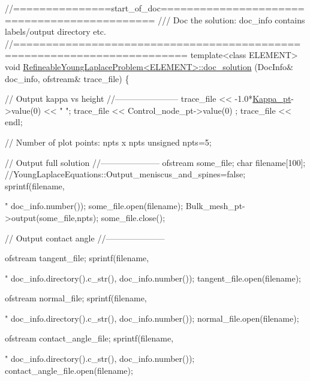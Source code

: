 \begin{DoxyCodeInclude}
\textcolor{comment}{//===============start\_of\_doc=============================================}
\textcolor{comment}{/// Doc the solution: doc\_info contains labels/output directory etc.}
\textcolor{comment}{}\textcolor{comment}{//========================================================================}
\textcolor{keyword}{template}<\textcolor{keyword}{class} ELEMENT>
\textcolor{keywordtype}{void} \hyperlink{classRefineableYoungLaplaceProblem_a4ec7313c8e4015b0c2af0bbef789e70f}{RefineableYoungLaplaceProblem<ELEMENT>::doc\_solution}
      (DocInfo& doc\_info,
                                              ofstream& trace\_file)
\{ 

 \textcolor{comment}{// Output kappa vs height}
 \textcolor{comment}{//-----------------------}
 trace\_file << -1.0*\hyperlink{namespaceGlobalParameters_ac6234184cce40ab2c6bec92b37e4ae41}{Kappa\_pt}->value(0) << \textcolor{stringliteral}{" "};
 trace\_file << Control\_node\_pt->value(0) ;
 trace\_file << endl;
  
 \textcolor{comment}{// Number of plot points: npts x npts}
 \textcolor{keywordtype}{unsigned} npts=5;

 \textcolor{comment}{// Output full solution }
 \textcolor{comment}{//---------------------}
 ofstream some\_file;
 \textcolor{keywordtype}{char} filename[100];
 \textcolor{comment}{//YoungLaplaceEquations::Output\_meniscus\_and\_spines=false;}
 sprintf(filename,\textcolor{stringliteral}{"%
         doc\_info.number());
 some\_file.open(filename);
 Bulk\_mesh\_pt->output(some\_file,npts);
 some\_file.close();

 \textcolor{comment}{// Output contact angle }
 \textcolor{comment}{//---------------------}

 ofstream tangent\_file;
 sprintf(filename,\textcolor{stringliteral}{"%
         doc\_info.directory().c\_str(),
         doc\_info.number());
 tangent\_file.open(filename);
 
 ofstream normal\_file;
 sprintf(filename,\textcolor{stringliteral}{"%
         doc\_info.directory().c\_str(),
         doc\_info.number());
 normal\_file.open(filename);
 
 
 ofstream contact\_angle\_file;
 sprintf(filename,\textcolor{stringliteral}{"%
         doc\_info.directory().c\_str(),
         doc\_info.number());
 contact\_angle\_file.open(filename);
 
}}}}
\end{DoxyCodeInclude}
